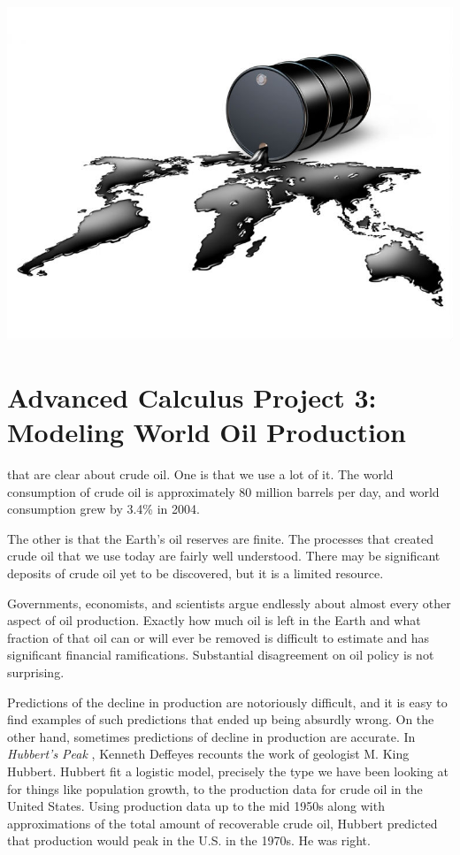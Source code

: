 \documentclass
[justified,nohyper]
{tufte-handout}
\begin{document}
\begin{center}
\includegraphics[scale=0.3]{oil.jpg}
\end{center}
\section{Advanced Calculus Project 3: Modeling World Oil Production}
 that are clear about crude oil. One is that we 
use a lot of it. The world consumption of crude oil is approximately 80 million 
barrels per day, and world consumption grew by 3.4\% in 2004.

The other is that the Earth's oil reserves are finite. The processes that
created crude oil that we use today are fairly well understood. There may be 
significant deposits of crude oil yet to be discovered, but it is a limited 
resource.

Governments, economists, and scientists argue endlessly about almost every other 
aspect of oil production. Exactly how much oil is left in the Earth and what 
fraction of that oil can or will ever be removed is difficult to estimate and 
has significant financial ramifications. Substantial disagreement on oil policy 
is not surprising.

Predictions of the decline in production are notoriously difficult, and it is 
easy to find examples of such predictions that ended up being absurdly wrong.
 On the other hand, sometimes 
predictions of decline in production are accurate. In \textit{Hubbert's Peak}
, Kenneth Deffeyes recounts the work of geologist M. 
King Hubbert. Hubbert fit a logistic model, precisely the type we have been 
looking at for things like population growth, to the production data for crude 
oil in the United States. Using production data up to the mid 1950s along with 
approximations of the total amount of recoverable crude oil, Hubbert predicted 
that production would peak in the U.S. in the 1970s. He was right.
\end{document}
